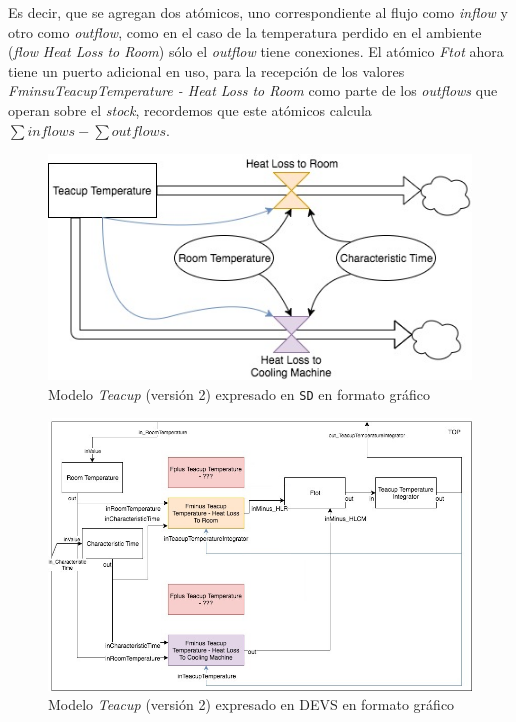 Es decir, que se agregan dos atómicos, uno correspondiente al flujo como \textit{inflow} y otro como \textit{outflow}, como en el caso de la temperatura perdido en el ambiente (\textit{flow} \textit{Heat Loss to Room}) sólo el \textit{outflow} tiene conexiones. El atómico \textit{Ftot} ahora tiene un puerto adicional en uso, para la recepción de los valores \textit{FminsuTeacupTemperature - Heat Loss to Room} como parte de los \textit{outflows} que operan sobre el \textit{stock}, recordemos que este atómicos calcula $\sum inflows - \sum outflows $.

\begin{figure}[!h]
\centering
\includegraphics[scale=0.4]{imagenes/Teacup_sd_2}
\caption{Modelo \textit{Teacup} (versión 2) expresado en \texttt{SD} en formato gráfico}
\label{fig:Teacup_sd_2}
\end{figure}

\begin{figure}[!h]
\centering
\includegraphics[scale=0.4]{imagenes/Teacup_devs_flattened_2}
\caption{Modelo \textit{Teacup} (versión 2) expresado en DEVS en formato gráfico}
\label{fig:Teacup_devs_flattened_2}
\end{figure}



